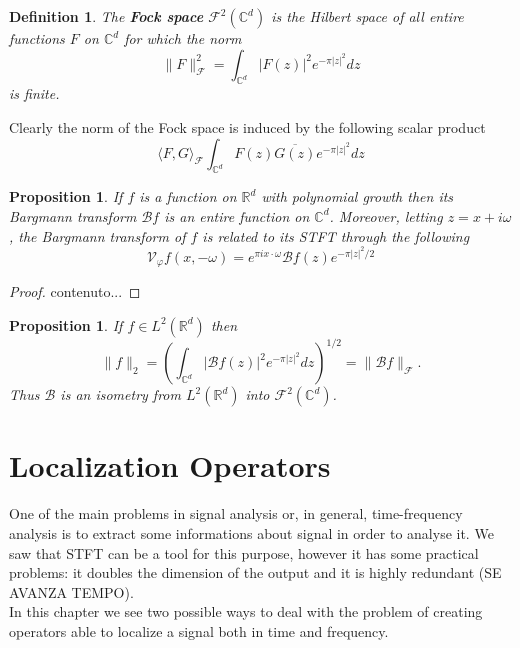 \documentclass[corpo=11pt, stile=classica, tipotesi=custom,
greek, evenboxes, english]{toptesi}
\numberwithin{equation}{chapter}
\newtheorem{defi}[teo]{Definition}
\newtheorem{prop}[teo]{Proposition}
\theoremstyle{remark}
\newcommand{\R}{\mathbb{R}} %
\newcommand{\V}{\mathcal{V}} %
\newcommand{\Fock}{\mathcal{F}} %
\newcommand{\C}{\mathbb{C}} %
\newcommand{\Barg}{\mathcal{B}} %
\begin{document}
\begin{defi}\label{Fock space}
	The \textbf{Fock space} $\Fock^2(\C^d)$ is the Hilbert space of all entire functions $F$ on $\C^d$ for which the norm
	\begin{equation}\label{Fock space norm}
		\|F\|^2_{\Fock} = \int_{\C^d} |F(z)|^2 e^{-\pi |z|^2}dz
	\end{equation}
	is finite.
\end{defi}
Clearly the norm of the Fock space is induced by the following scalar product
\begin{equation}\label{Fock space scalar product}
	\langle F,G \rangle_{\Fock} \int_{\C^d} F(z) \overline{G(z)} e^{-\pi |z|^2}dz
\end{equation}
\begin{prop}
	If $f$ is a function on $\R^d$ with polynomial growth then its Bargmann transform $\Barg f$ is an entire function on $\C^d$. Moreover, letting $z = x + i\omega$, the Bargmann transform of $f$ is related to its STFT through the following
	\begin{equation}\label{connection between Bargmann transform and STFT}
		\V_{\varphi} f(x,-\omega) = e^{\pi i x \cdot \omega} \Barg f(z) e^{-\pi |z|^2/2}
	\end{equation}
\end{prop}
\begin{proof}
	contenuto...
\end{proof}
\begin{prop}
	If $f \in L^2(\R^d)$ then
	\begin{equation}
		\|f\|_2 = \left(\int_{\C^d} |\Barg f(z)|^2 e^{-\pi |z|^2}dz\right)^{1/2} = \|\Barg f\|_{\Fock}.
	\end{equation}
	Thus $\Barg$ is an isometry from $L^2(\R^d)$ into $\Fock^2(\C^d)$.
\end{prop}

\chapter{Localization Operators}\label{chapter localization operators}
One of the main problems in signal analysis or, in general, time-frequency analysis is to extract some informations about signal in order to analyse it. {\color{red}We saw that STFT can be a tool for this purpose, however it has some practical problems: it doubles the dimension of the output and it is highly redundant (SE AVANZA TEMPO).}\\
In this chapter we see two possible ways to deal with the problem of creating operators able to localize a signal both in time and frequency.
\end{document}

